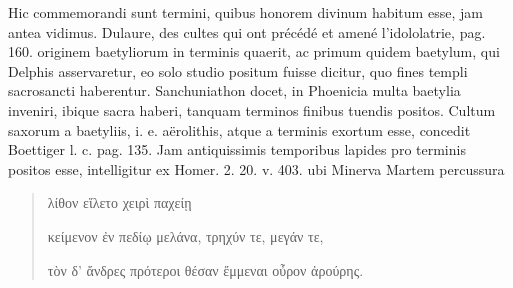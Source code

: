 \documentclass[a4paper, 11pt, oneside, polutonikogreek, german]{article}
\begin{document}
Hic commemorandi sunt termini, quibus honorem divinum habitum esse, jam antea vidimus. Dulaure, des cultes qui ont précédé et amené l'idololatrie, pag. 160. originem baetyliorum in terminis quaerit, ac primum quidem baetylum, qui Delphis asservaretur, eo solo studio positum fuisse dicitur, quo fines templi sacrosancti haberentur. Sanchuniathon docet, in Phoenicia multa baetylia inveniri, ibique sacra haberi, tanquam terminos finibus tuendis positos. Cultum saxorum a baetyliis, i. e. aërolithis, atque a terminis exortum esse, concedit Boettiger l. c. pag. 135. Jam antiquissimis temporibus lapides pro terminis positos esse, intelligitur ex Homer. 2. 20. v. 403. ubi Minerva Martem percussura
\begin{quotation}
\hspace*{15mm}λίθον εἵλετο χειρὶ παχείῃ

κείμενον ἐν πεδίῳ μελάνα, τρηχύν τε, μεγάν τε,

τὸν δ' ἄνδρες πρότεροι θέσαν ἔμμεναι οὖρον ἀρούρης.
\end{quotation}
\end{document}
